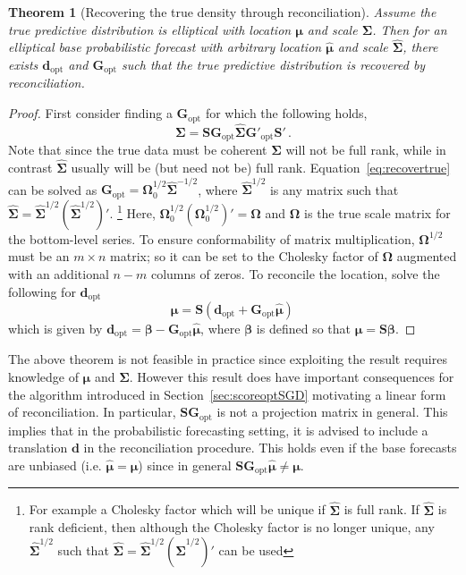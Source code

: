 \documentclass[a4paper,12pt]{article}
\newtheorem{theo}{Theorem}[section]
\theoremstyle{definition}
\begin{document}
\begin{theo}[Recovering the true density through reconciliation]\label{theo:OptRec}
	Assume the true predictive distribution is elliptical with location ${\bm\mu}$ and scale ${\bm\Sigma}$. Then for an elliptical base probabilistic forecast with arbitrary location $\hat{\bm\mu}$ and scale $\hat{\bm\Sigma}$, there exists $\bm{d}_{\text{opt}}$ and $\bm{G}_{\text{opt}}$ such that the true predictive distribution is recovered by reconciliation.
\end{theo}
\begin{proof}
	First consider finding a $\bm{G}_{\text{opt}}$ for which the following holds,
	\begin{equation}
	\label{eq:recovertrue}
	\bm{\Sigma}=\bm{S}\bm{G}_{\text{opt}}\hat{\bm{\Sigma}}\bm{G}'_{\text{opt}}\bm{S}'\,.
	\end{equation}
	Note that since the true data must be coherent $\bm{\Sigma}$ will not be full rank, while in contrast $\hat{\bm{\Sigma}}$ usually will be (but need not be) full rank. Equation~\eqref{eq:recovertrue} can be solved as $\bm{G}_{\text{opt}}=\bm{\Omega}_0^{1/2}\hat{\bm{\Sigma}}^{-1/2}$, where $\hat{\bm{\Sigma}}^{1/2}$ is any matrix such that $\hat{\bm{\Sigma}}=\hat{\bm{\Sigma}}^{1/2}(\hat{\bm{\Sigma}}^{1/2})'$. \footnote{For example a Cholesky factor which will be unique if $\hat{\bm{\Sigma}}$ is full rank.  If $\hat{\bm{\Sigma}}$ is rank deficient, then although the Cholesky factor is no longer unique, any $\hat{\bm{\Sigma}}^{1/2}$ such that $\hat{\bm{\Sigma}}=\hat{\bm{\Sigma}}^{1/2}(\hat{\bm{\Sigma}}^{1/2})'$ can be used} Here, ${\bm{\Omega}}_0^{1/2}({\bm{\Omega}}_0^{1/2})'={\bm\Omega}$ and ${\bm\Omega}$ is the true scale matrix for the bottom-level series. To ensure conformability of matrix multiplication, ${\bm{\Omega}}^{1/2}$ must be an $m\times n$ matrix; so it can be set to the Cholesky factor of ${\bm{\Omega}}$ augmented with an additional $n-m$ columns of zeros. To reconcile the location, solve the following for $\bm{d}_{\text{opt}}$
	\begin{equation*}
	\bm{\mu}=\bm{S}(\bm{d}_{\text{opt}}+\bm{G}_{\text{opt}}\hat{\bm{\mu}})\,
	\end{equation*}
	which is given by $\bm{d}_{\text{opt}}=\bm{\beta}-\bm{G}_{\text{opt}}\hat{\bm\mu}$, where $\bm{\beta}$ is defined so that $\bm{\mu}=\bm{S}\bm{\beta}$.
\end{proof}

The above theorem is not feasible in practice since exploiting the result requires knowledge of $\bm{\mu}$ and $\bm{\Sigma}$.  However this result does have important consequences for the algorithm introduced in Section~\ref{sec:scoreoptSGD} motivating a linear form of reconciliation. In particular, $\bm{S}\bm{G}_{\text{opt}}$ is not a projection matrix in general. This implies that in the probabilistic forecasting setting, it is advised to include a translation $\bm{d}$ in the reconciliation procedure. This holds even if the base forecasts are unbiased (i.e. $\hat{\bm{\mu}}=\bm{\mu}$) since in general $\bm{S}\bm{G}_{\text{opt}}\hat{\bm{\mu}}\neq\bm{\mu}$.
\end{document}
